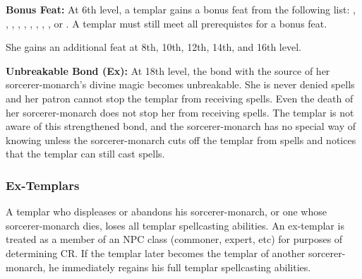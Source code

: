 \textbf{Bonus Feat:} At 6th level, a templar gains a bonus feat from the following list:
,
,
,
,
,
,
,
,
,
or .
A templar must still meet all prerequistes for a bonus feat.

She gains an additional feat at 8th, 10th, 12th, 14th, and 16th level.


\textbf{Unbreakable Bond (Ex):} At 18th level, the bond with the source of her sorcerer-monarch's divine magic becomes unbreakable. She is never denied spells and her patron cannot stop the templar from receiving spells. Even the death of her sorcerer-monarch does not stop her from receiving spells. The templar is not aware of this strengthened bond, and the sorcerer-monarch has no special way of knowing unless the sorcerer-monarch cuts off the templar from spells and notices that the templar can still cast spells.



\subsubsection{Ex-Templars}
A templar who displeases or abandons his sorcerer-monarch, or one whose sorcerer-monarch dies, loses all templar spellcasting abilities. An ex-templar is treated as a member of an NPC class (commoner, expert, etc) for purposes of determining CR. If the templar later becomes the templar of another sorcerer-monarch, he immediately regains his full templar spellcasting abilities.





